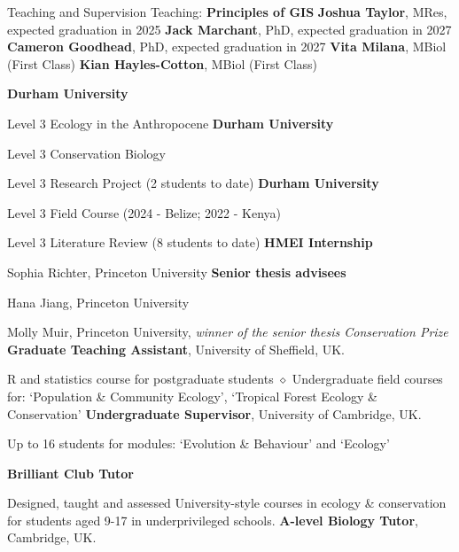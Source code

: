 \begin{rubric}{Teaching and Supervision}
\entry*[2023-present] Teaching: \textbf{Principles of GIS}
\entry*[2024-present] \textbf{Joshua Taylor}, MRes, expected graduation in 2025
\entry*[2023-present] \textbf{Jack Marchant}, PhD, expected graduation in 2027
\entry*[2023-present] \textbf{Cameron Goodhead}, PhD, expected graduation in 2027
\entry*[2023-2024] \textbf{Vita Milana}, MBiol (First Class)
\entry*[2022-2023] \textbf{Kian Hayles-Cotton}, MBiol (First Class)


\entry*[2024-present] \textbf{Durham University}
	\par Level 3 Ecology in the Anthropocene
\entry*[2023-present] \textbf{Durham University}
	\par Level 3 Conservation Biology
	\par Level 3 Research Project (2 students to date)
\entry*[2022-present] \textbf{Durham University}
	\par Level 3 Field Course (2024 - Belize; 2022 - Kenya)
	\par Level 3 Literature Review (8 students to date)
\entry*[2021] \textbf{HMEI Internship}
	\par Sophia Richter, Princeton University
\entry*[2019 -- 2021] \textbf{Senior thesis advisees}
	\par Hana Jiang, Princeton University
	\par Molly Muir, Princeton University, \emph{winner of the senior thesis Conservation Prize}
\entry*[2014 -- 2018] \textbf{Graduate Teaching Assistant}, University of Sheffield, UK.
	\par R and statistics course for postgraduate students $\diamond$ Undergraduate field courses for: `Population \& Community Ecology', `Tropical Forest Ecology \& Conservation'
\entry*[2013 -- 2014] \textbf{Undergraduate Supervisor}, University of Cambridge, UK.
	\par Up to 16 students for modules: `Evolution \& Behaviour' and  `Ecology'


\entry*[2017 -- 2021] \textbf{Brilliant Club Tutor}
	\par Designed, taught and assessed University-style courses in ecology \& conservation for students aged 9-17 in underprivileged schools.
\entry*[2013 -- 2014] \textbf{A-level Biology Tutor}, Cambridge, UK.

\end{rubric}
